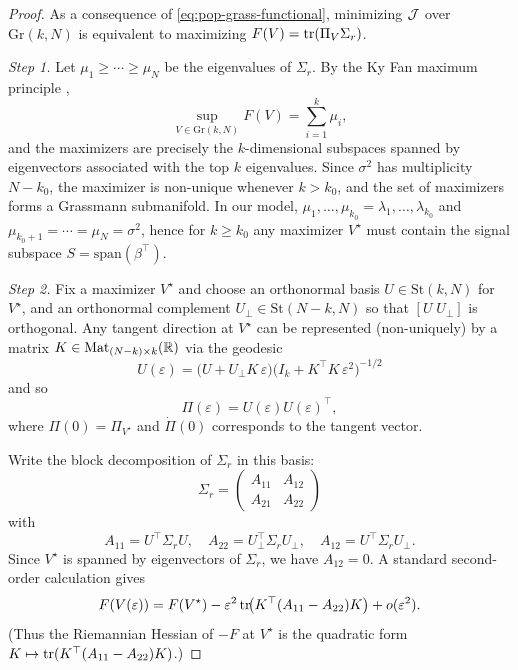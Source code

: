 \documentclass[twoside,11pt,letter]{article}
\begin{document}
\begin{proof}
As a consequence of \eqref{eq:pop-grass-functional}, minimizing ${\mathcal{J}}$ over $\mathrm{Gr}(k,N)$ is equivalent to maximizing $F(V)=\mathrm{tr}(\Pi_V\Sigma_r)$.
	
\smallskip\noindent
\textit{Step 1.} Let $\mu_1\ge\cdots\ge \mu_N$ be the eigenvalues of $\Sigma_r$. By the Ky Fan maximum principle \cite{B97}, 
\begin{equation*}
\sup_{V\in \mathrm{Gr}(k,N)} F(V)=\sum_{i=1}^k \mu_i,
\end{equation*}
and the maximizers are precisely the $k$-dimensional subspaces spanned by eigenvectors associated with the top $k$ eigenvalues. Since $\sigma^2$ has multiplicity $N-k_0$, the maximizer is non-unique whenever $k>k_0$, and the set of maximizers forms a Grassmann submanifold. In our model, $\mu_1,\ldots,\mu_{k_0}=\lambda_1,\ldots,\lambda_{k_0}$ and $\mu_{k_0+1}=\cdots=\mu_N=\sigma^2$, hence for $k\ge k_0$ any maximizer $V^\star$ must contain the signal subspace $S=\mathrm{span}(\beta^\top)$.

\smallskip\noindent
\textit{Step 2.} Fix a maximizer $V^\star$ and choose an orthonormal basis $U\in\mathrm{St}(k,N)$ for $V^\star$, and an orthonormal complement $U_\perp\in\mathrm{St}(N-k,N)$ so that $[U\;U_\perp]$ is orthogonal. Any tangent direction at $V^\star$ can be represented (non-uniquely) by a matrix
$K\in\mathrm{Mat}_{(N-k)\times k}(\mathbb{R})$ via the geodesic
\begin{equation*}
U(\varepsilon)=\bigl(U+U_\perp K\,\varepsilon\bigr)\bigl(I_k+K^\top K\,\varepsilon^2\bigr)^{-1/2}
\end{equation*}
and so
\begin{equation*}
\Pi(\varepsilon)=U(\varepsilon)U(\varepsilon)^\top,
\end{equation*}
where $\Pi(0)=\Pi_{V^\star}$ and $\dot\Pi(0)$ corresponds to the tangent vector.

Write the block decomposition of $\Sigma_r$ in this basis:
\begin{equation*}
\Sigma_r=
\begin{pmatrix}
A_{11} & A_{12}\\
A_{21} & A_{22}
\end{pmatrix}
\end{equation*}
with
\begin{equation*}
A_{11}=U^\top\Sigma_r U,\quad A_{22}=U_\perp^\top\Sigma_r U_\perp,\quad A_{12}=U^\top\Sigma_r U_\perp.
\end{equation*}
Since $V^\star$ is spanned by eigenvectors of $\Sigma_r$, we have $A_{12}=0$. A standard second-order calculation gives
\begin{equation}\label{eq:second-var}
F(V(\varepsilon))=F(V^\star)-\varepsilon^2\,\mathrm{tr}\!\bigl(K^\top(A_{11}-A_{22})K\bigr)+o(\varepsilon^2).
\end{equation}
(Thus the Riemannian Hessian of $-\!F$ at $V^\star$ is the quadratic form $K\mapsto \mathrm{tr}(K^\top(A_{11}-A_{22})K)$.)


\end{proof}
\end{document}
